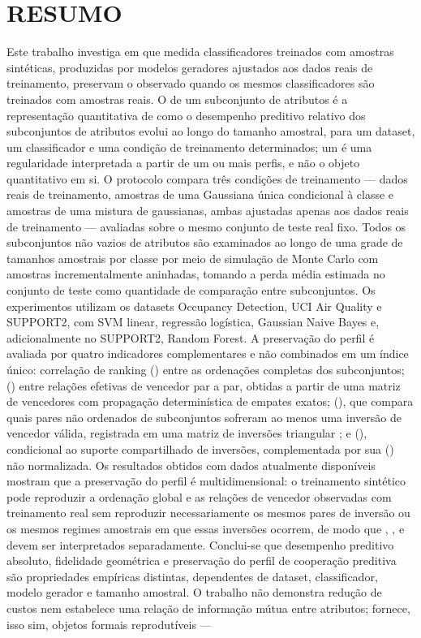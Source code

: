 \clearpage
{}
\chapter*{RESUMO}

Este trabalho investiga em que medida classificadores treinados com amostras sintéticas, produzidas por modelos geradores ajustados aos dados reais de treinamento, preservam o \PredictiveCooperationProfile{} observado quando os mesmos classificadores são treinados com amostras reais. O \PredictiveCooperationProfile{} de um subconjunto de atributos é a representação quantitativa de como o desempenho preditivo relativo dos subconjuntos de atributos evolui ao longo do tamanho amostral, para um dataset, um classificador e uma condição de treinamento determinados; um \PredictiveCooperationPattern{} é uma regularidade interpretada a partir de um ou mais perfis, e não o objeto quantitativo em si. O protocolo compara três condições de treinamento --- dados reais de treinamento, amostras de uma Gaussiana única condicional à classe e amostras de uma mistura de gaussianas, ambas ajustadas apenas aos dados reais de treinamento --- avaliadas sobre o mesmo conjunto de teste real fixo. Todos os subconjuntos não vazios de atributos são examinados ao longo de uma grade de tamanhos amostrais por classe por meio de simulação de Monte Carlo com amostras incrementalmente aninhadas, tomando a perda média estimada no conjunto de teste como quantidade de comparação entre subconjuntos. Os experimentos utilizam os datasets Occupancy Detection, UCI Air Quality e SUPPORT2, com SVM linear, regressão logística, Gaussian Naive Bayes e, adicionalmente no SUPPORT2, Random Forest. A preservação do perfil é avaliada por quatro indicadores complementares e não combinados em um índice único: correlação de ranking (\rankrho) entre as ordenações completas dos subconjuntos; \WinnersAgreement{} (\AW) entre relações efetivas de vencedor par a par, obtidas a partir de uma matriz de vencedores \Wmat{} com propagação determinística de empates exatos; \ReversalExistenceAgreement{} (\AR), que compara quais pares não ordenados de subconjuntos sofreram ao menos uma inversão de vencedor válida, registrada em uma matriz de inversões triangular \Rmat{}; e \ReversalSampleSizeSimilarity{} (\SR), condicional ao suporte compartilhado de inversões, complementada por sua \MeanLogReversalDistance{} (\DR{}) não normalizada. Os resultados obtidos com dados atualmente disponíveis mostram que a preservação do perfil é multidimensional: o treinamento sintético pode reproduzir a ordenação global e as relações de vencedor observadas com treinamento real sem reproduzir necessariamente os mesmos pares de inversão ou os mesmos regimes amostrais em que essas inversões ocorrem, de modo que \rankrho{}, \AW{}, \AR{} e \SR{} devem ser interpretados separadamente. Conclui-se que desempenho preditivo absoluto, fidelidade geométrica e preservação do perfil de cooperação preditiva são propriedades empíricas distintas, dependentes de dataset, classificador, modelo gerador e tamanho amostral. O trabalho não demonstra redução de custos nem estabelece uma relação de informação mútua entre atributos; fornece, isso sim, objetos formais reprodutíveis --- 